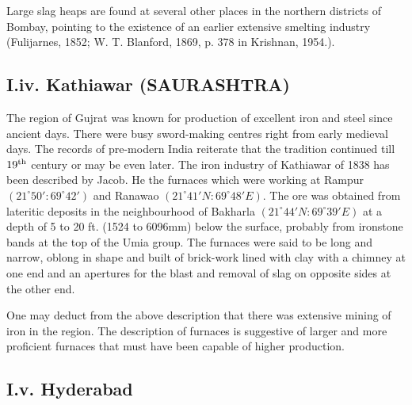 Large slag heaps are found at several other places in the northern districts of Bombay, pointing to the existence of an earlier extensive smelting industry (Fulijarnes, 1852; W. T. Blanford, 1869, p. 378 in Krishnan, 1954.).

\vspace{-.3cm}

\subsection*{I.iv.  Kathiawar (SAURASHTRA)}\label{subsection-4}

\vspace{-.2cm}

The region of Gujrat was known for production of excellent iron and steel since ancient days. There were busy sword-making centres right from early medieval days. The records of pre-modern India reiterate that the tradition continued till $19^{\rm th}$ century or may be even later. The iron industry of Kathiawar of 1838 has been described by Jacob. He the furnaces which were working at Rampur $(21^\circ 50': 69^\circ 42')$ and Ranawao $(21^\circ 41'N: 69^\circ 48'E)$. The ore was obtained from lateritic deposits in the neighbourhood of Bakharla $(21^\circ 44'N: 69^\circ 39'E)$ at a depth of 5 to 20 ft. (1524 to 6096mm) below the surface, probably from ironstone bands at the top of the Umia group.  The furnaces were said to be long and narrow, oblong in shape and built of brick-work lined with clay with a chimney at one end and an apertures for the blast and removal of slag on opposite sides at the other end. 

One may deduct from the above description that there was extensive mining of iron in the region. The description of furnaces is suggestive of larger and more proficient furnaces that must have been capable of higher production. 

\vspace{-.3cm}

\subsection*{I.v.  Hyderabad}\label{subsection-5}

\vspace{-.2cm}

